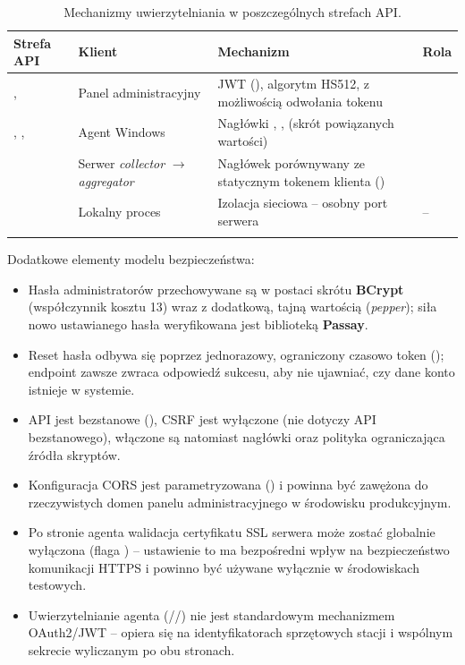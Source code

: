 \begingroup\footnotesize
\begin{longtable}{M{3.2cm} M{3.6cm} M{3.6cm} M{4.6cm}}
\toprule
{}
\textbf{Strefa API} & \textbf{Klient} & \textbf{Mechanizm} & \textbf{Rola} \\
\midrule
\endhead
{},  & Panel administracyjny & JWT (), algorytm HS512, z możliwością odwołania tokenu &  \\
, ,  & Agent Windows & Nagłówki , ,  (skrót powiązanych wartości) &  \\
 & Serwer \emph{collector} $\rightarrow$ \emph{aggregator} & Nagłówek  porównywany ze statycznym tokenem klienta () &  \\
 & Lokalny proces  & Izolacja sieciowa -- osobny port serwera & -- \\
\bottomrule
\caption{Mechanizmy uwierzytelniania w poszczególnych strefach API.}
\end{longtable}
\endgroup

\noindent Dodatkowe elementy modelu bezpieczeństwa:

\begin{itemize}[leftmargin=1.6em]
  \item Hasła administratorów przechowywane są w postaci skrótu \textbf{BCrypt} (współczynnik
        kosztu 13) wraz z dodatkową, tajną wartością (\emph{pepper}); siła nowo ustawianego hasła
        weryfikowana jest biblioteką \textbf{Passay}.
  \item Reset hasła odbywa się poprzez jednorazowy, ograniczony czasowo token
        (); endpoint  zawsze zwraca odpowiedź
        sukcesu, aby nie ujawniać, czy dane konto istnieje w systemie.
  \item API jest bezstanowe (), CSRF jest wyłączone
        (nie dotyczy API bezstanowego), włączone są natomiast nagłówki 
        oraz polityka  ograniczająca źródła skryptów.
  \item Konfiguracja CORS jest parametryzowana () i powinna być
        zawężona do rzeczywistych domen panelu administracyjnego w środowisku produkcyjnym.
  \item Po stronie agenta walidacja certyfikatu SSL serwera może zostać globalnie wyłączona
        (flaga ) -- ustawienie to ma bezpośredni wpływ na
        bezpieczeństwo komunikacji HTTPS i powinno być używane wyłącznie w środowiskach
        testowych.
  \item Uwierzytelnianie agenta (//) nie jest
        standardowym mechanizmem OAuth2/JWT -- opiera się na identyfikatorach sprzętowych stacji
        i wspólnym sekrecie wyliczanym po obu stronach.
\end{itemize}

